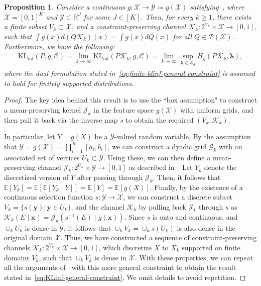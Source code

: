 \documentclass{article}
\theoremstyle{plain}
\newtheorem{proposition}[proposition]{Proposition}
\theoremstyle{definition}
\newcommand{\KLinf}{\operatorname{KL_{inf}}}
\newcommand{\calP}{\mathcal P}
\newcommand{\calG}{\mathcal G}
\newcommand{\calC}{\mathcal C}
\newcommand{\calJ}{\mathcal J}
\newcommand{\calX}{\mathcal X}
\newcommand{\calL}{\mathcal L}
\newcommand{\calK}{\mathcal{K}}
\newcommand{\calY}{\mathcal Y}
\newcommand{\xvec}{\mathbf{x}}
\newcommand{\yvec}{\mathbf{y}}
\newcommand{\boldlambda}{\boldsymbol{\lambda}}
\begin{document}
\begin{proposition}
    \label{prop:bijective-constraints} Consider a continuous $g:\calX \to \calY \coloneqq g(\calX)$ satisfying~, where $\calX = [0,1]^K$ and $\calY \subset \mathbb{R}^J$ for some $J \in [K]$.  Then, for every $k \geq 1$, there exists a finite subset $V_k \subset \calX$, and a constraint-preserving channel $\calK_k:2^{V_k} \times \calX \to [0,1]$, such that $\int g(x) d(Q\calK_k)(x) = \int g(x) dQ(x)$ for all $Q \in \calP(\calX)$. Furthermore, we have the following: 
    \begin{align}
        \KLinf(P, g, \calC) = \lim_{k \to \infty} \KLinf(P \calK_k, g, \calC) = \lim_{k \to \infty} \sup_{\boldlambda \in \calL_g} H_g( P \calK_k, \boldlambda), \label{eq:KLinf-general-constraint}
    \end{align}
    where the dual formulation stated in~\eqref{eq:finite-klinf-general-constraint} is assumed to hold for finitely supported distributions. 
\end{proposition}
\begin{proof}
The key idea behind this result is to use the ``box assumption" to construct a mean-preserving kernel $\calJ_k$ in the feature space $g(\calX)$ with uniform grids, and then pull it back via the inverse map $s$ to obtain the required $(V_k, \calK_k)$. 

In particular, let $Y = g(X)$ be a $\calY$-valued random variable. By the assumption that $\calY = g(\calX) = \prod_{i=1}^K [a_i, b_i]$, we can construct a dyadic grid $\calG_k$ with an associated set of vertices $U_k \subset \calY$. Using these, we can then define a mean-preserving channel $\calJ_k:2^{U_k} \times \calY \to [0,1]$ as described in~. Let $Y_k$ denote the discretized version of $Y$ after passing through $\calJ_k$. Then, it follows that $\mathbb{E}[Y_k] = \mathbb{E}[\mathbb{E}[Y_k \mid Y] ] = \mathbb{E}[Y] = \mathbb{E}[g(X)]$. Finally, by the existence of a continuous selection function $s:\calY \to \calX$, we can construct a discrete subset $V_k = \{s(\yvec): \yvec \in U_k\}$, and the channel $\calK_k$ by  pulling back $\calJ_k$ through $s$ as $\calK_k(E \mid \xvec) = \calJ_k(s^{-1}(E) \mid g(\xvec))$.  
Since $s$ is onto and continuous, and $\cup_k U_k$ is dense in $\calY$, it follows that $\cup_k V_k = \cup_k s(U_k)$ is also dense in the original domain $\calX$. 
Thus, we have constructed a sequence of constraint-preserving channels $\calK_k:2^{V_k} \times \calX \to [0,1]$, which discretize $X$ to $X_k$ supported on finite domains $V_k$, such that $\cup_k V_k$ is dense in $\calX$. With these properties, we can repeat all the arguments of~ with this more general constraint to obtain the result stated in~\eqref{eq:KLinf-general-constraint}. We omit details to avoid repetition. 
\end{proof}
\end{document}
